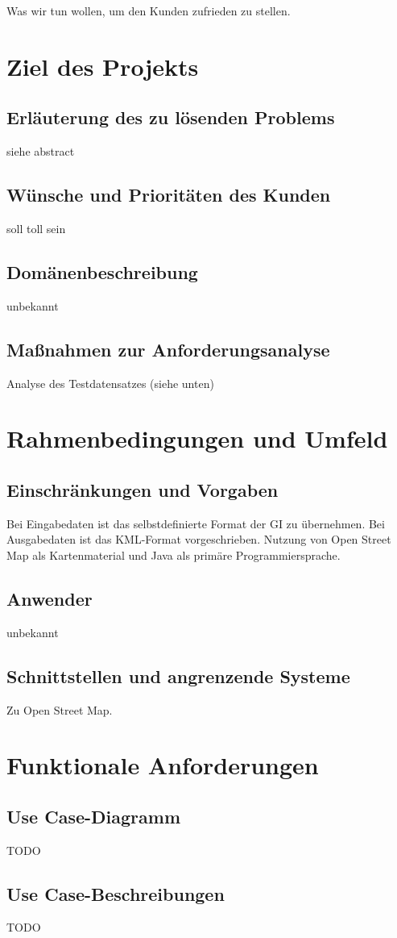 Was wir tun wollen, um den Kunden zufrieden zu stellen.
\section{Ziel des Projekts}
\subsection{Erläuterung des zu lösenden Problems}
siehe abstract
\subsection{Wünsche und Prioritäten des Kunden}
soll toll sein
\subsection{Domänenbeschreibung}
unbekannt
\subsection{Maßnahmen zur Anforderungsanalyse}
Analyse des Testdatensatzes (siehe unten)
\section{Rahmenbedingungen und Umfeld}
\subsection{Einschränkungen und Vorgaben}
Bei Eingabedaten ist das selbstdefinierte Format der GI zu übernehmen. Bei Ausgabedaten ist das KML-Format vorgeschrieben. 
Nutzung von Open Street Map als Kartenmaterial und Java als primäre Programmiersprache.
\subsection{Anwender}
unbekannt
\subsection{Schnittstellen und angrenzende Systeme}
Zu Open Street Map.
\section{Funktionale Anforderungen}
\subsection{Use Case-Diagramm}
TODO
\subsection{Use Case-Beschreibungen}
TODO
